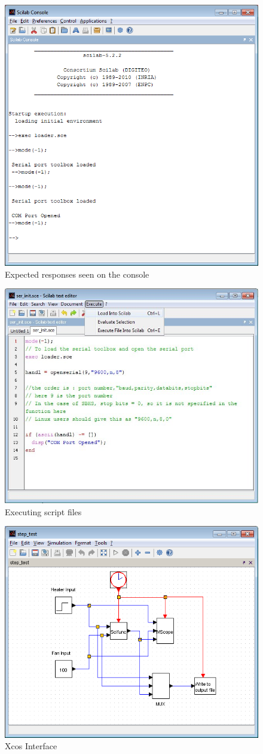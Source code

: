 \begin{figure}
\centering
\includegraphics[width=0.7\linewidth]{using-sbhs/console.png}
\caption{Expected responses seen on the console}
\label{loader}
\end{figure}


\begin{figure}
\centering
\includegraphics[width=0.7\linewidth]{using-sbhs/scilab1.jpg}
\caption{Executing script files}
\label{exec}
\end{figure}

\begin{figure}
\centering
\includegraphics[width=0.7\linewidth]{using-sbhs/xcos.png}
\caption{Xcos Interface}
\label{Xcosintr}
\end{figure}

